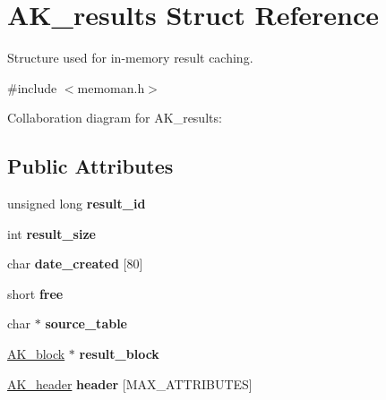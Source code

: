 \hypertarget{structAK__results}{}\section{A\+K\+\_\+results Struct Reference}
\label{structAK__results}


Structure used for in-\/memory result caching.  




{\ttfamily \#include $<$memoman.\+h$>$}



Collaboration diagram for A\+K\+\_\+results\+:
\subsection*{Public Attributes}
\begin{DoxyCompactItemize}
\item 
unsigned long {\bfseries result\+\_\+id}\hypertarget{structAK__results_a711198cb42416424b8ac85a9a5c33666}{}\label{structAK__results_a711198cb42416424b8ac85a9a5c33666}

\item 
int {\bfseries result\+\_\+size}\hypertarget{structAK__results_a0247e1e7bc724494fa4d834412785f65}{}\label{structAK__results_a0247e1e7bc724494fa4d834412785f65}

\item 
char {\bfseries date\+\_\+created} \mbox{[}80\mbox{]}\hypertarget{structAK__results_a5eac49f04f7882ab4c0e7552cbfd1b61}{}\label{structAK__results_a5eac49f04f7882ab4c0e7552cbfd1b61}

\item 
short {\bfseries free}\hypertarget{structAK__results_a76737ffacf19dd180b856a8bf28f7cb1}{}\label{structAK__results_a76737ffacf19dd180b856a8bf28f7cb1}

\item 
char $\ast$ {\bfseries source\+\_\+table}\hypertarget{structAK__results_a3bbe860a120adfff7f78b228785abae9}{}\label{structAK__results_a3bbe860a120adfff7f78b228785abae9}

\item 
\hyperlink{structAK__block}{A\+K\+\_\+block} $\ast$ {\bfseries result\+\_\+block}\hypertarget{structAK__results_aebd697e8f81547bb7b4c27ff944e5913}{}\label{structAK__results_aebd697e8f81547bb7b4c27ff944e5913}

\item 
\hyperlink{structAK__header}{A\+K\+\_\+header} {\bfseries header} \mbox{[}M\+A\+X\+\_\+\+A\+T\+T\+R\+I\+B\+U\+T\+ES\mbox{]}\hypertarget{structAK__results_adce1e1dcd808bb24a122661aa7fbfe7b}{}\label{structAK__results_adce1e1dcd808bb24a122661aa7fbfe7b}

\end{DoxyCompactItemize}


